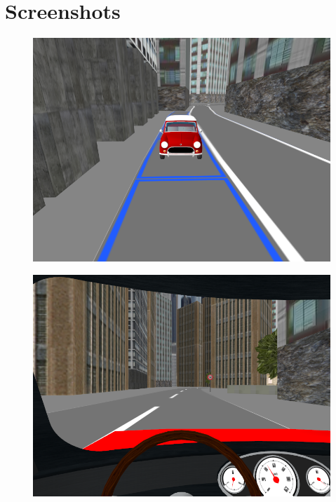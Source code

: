 \section{Screenshots}

\begin{figure}[H]
\flushleft 
\includegraphics[width=0.9\linewidth]{src/screenshot1.png}
\end{figure}

\begin{figure}[H]
\flushleft 
\includegraphics[width=0.9\linewidth]{src/screenshot2.png}
\end{figure}

\newpage

